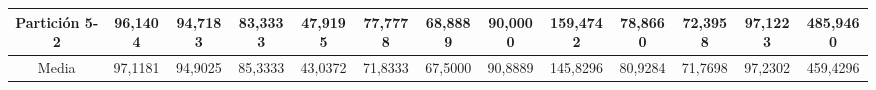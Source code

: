 \documentclass[12pt]{article}
\begin{document}
\begin{table}[H]
{\begin{tabular}{|c|cccc|cccc|cccc|}
Partición 5-2 & \multicolumn{1}{c|}{96,1404}                                                  & \multicolumn{1}{c|}{94,7183}                                                 & \multicolumn{1}{c|}{83,3333} & 47,9195 & \multicolumn{1}{c|}{77,7778}                                                  & \multicolumn{1}{c|}{68,8889}                                                 & \multicolumn{1}{c|}{90,0000} & 159,4742 & \multicolumn{1}{c|}{78,8660}                                                  & \multicolumn{1}{c|}{72,3958}                                                 & \multicolumn{1}{c|}{97,1223} & 485,9460 \\ \hline
Media         & \multicolumn{1}{c|}{97,1181}                                                  & \multicolumn{1}{c|}{94,9025}                                                 & \multicolumn{1}{c|}{85,3333} & 43,0372 & \multicolumn{1}{c|}{71,8333}                                                  & \multicolumn{1}{c|}{67,5000}                                                 & \multicolumn{1}{c|}{90,8889} & 145,8296 & \multicolumn{1}{c|}{80,9284}                                                  & \multicolumn{1}{c|}{71,7698}                                                 & \multicolumn{1}{c|}{97,2302} & 459,4296 \\ \hline
\end{tabular}}
\end{table}
\end{document}
